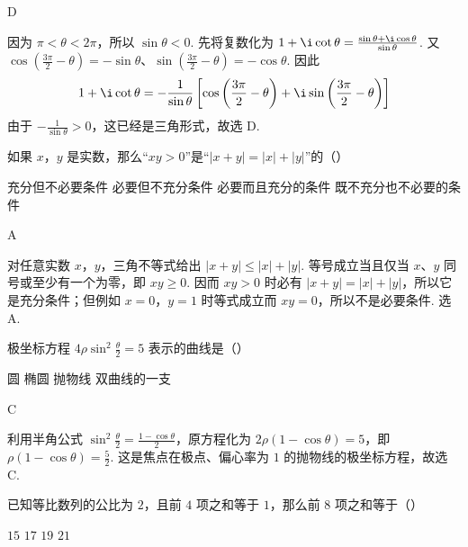 \documentclass[UTF8,a4paper,oneside,11pt]{ctexbook}
\begin{document}
\begin{answer}
D
\end{answer}

\begin{solution}
因为 \(\pi<\theta<2\pi\)，所以 \(\sin\theta<0\). 先将复数化为
\(1+\i\cot\theta=\frac{\sin\theta+\i\cos\theta}{\sin\theta}\).
又
\(\cos\left(\frac{3\pi}{2}-\theta\right)=-\sin\theta\)、\(\sin\left(\frac{3\pi}{2}-\theta\right)=-\cos\theta\).
因此
\[
1+\i\cot\theta
=-\frac{1}{\sin\theta}
\left[
\cos\left(\frac{3\pi}{2}-\theta\right)
+\i\sin\left(\frac{3\pi}{2}-\theta\right)
\right]
\]
由于 \(-\frac{1}{\sin\theta}>0\)，这已经是三角形式，故选 D.
\end{solution}

\begin{problem}
如果 \(x\)，\(y\) 是实数，那么“\(xy>0\)”是“\(|x+y|=|x|+|y|\)”的（\quad）

\choices
    {充分但不必要条件}
    {必要但不充分条件}
    {必要而且充分的条件}
    {既不充分也不必要的条件}
\end{problem}

\begin{answer}
A
\end{answer}

\begin{solution}
对任意实数 \(x\)，\(y\)，三角不等式给出
\(|x+y|\leqslant |x|+|y|\).
等号成立当且仅当 \(x\)、\(y\) 同号或至少有一个为零，即 \(xy\geqslant0\). 因而 \(xy>0\) 时必有 \(|x+y|=|x|+|y|\)，所以它是充分条件；但例如 \(x=0\)，\(y=1\) 时等式成立而 \(xy=0\)，所以不是必要条件. 选 A.
\end{solution}

\begin{problem}
极坐标方程 \(4\rho\sin^2\frac{\theta}{2}=5\) 表示的曲线是（\quad）

\choices
    {圆}
    {椭圆}
    {抛物线}
    {双曲线的一支}
\end{problem}

\begin{answer}
C
\end{answer}

\begin{solution}
利用半角公式
\(\sin^2\frac{\theta}{2}=\frac{1-\cos\theta}{2}\)，原方程化为 \(2\rho(1-\cos\theta)=5\)，即 \(\rho(1-\cos\theta)=\frac{5}{2}\).
这是焦点在极点、偏心率为 \(1\) 的抛物线的极坐标方程，故选 C.
\end{solution}

\begin{problem}
已知等比数列的公比为 \(2\)，且前 \(4\) 项之和等于 \(1\)，那么前 \(8\) 项之和等于（\quad）

\choices
    {\(15\)}
    {\(17\)}
    {\(19\)}
    {\(21\)}
\end{problem}
\end{document}
